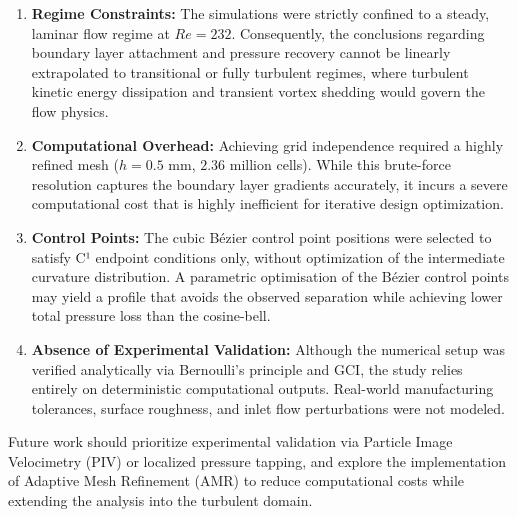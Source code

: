 \documentclass[12pt, a4paper]{article}
\begin{document}
\begin{enumerate}
	\item \textbf{Regime Constraints:} The simulations were strictly confined to a steady, laminar flow regime at $Re = 232$. Consequently, the conclusions regarding boundary layer attachment and pressure recovery cannot be linearly extrapolated to transitional or fully turbulent regimes, where turbulent kinetic energy dissipation and transient vortex shedding would govern the flow physics.
	\item \textbf{Computational Overhead:} Achieving grid independence required a highly refined mesh ($h = 0.5$ mm, $2.36$ million cells). While this brute-force resolution captures the boundary layer gradients accurately, it incurs a severe computational cost that is highly inefficient for iterative design optimization. 

	\item \textbf{Control Points:} The cubic Bézier control point positions were selected to satisfy C¹ endpoint conditions only, without optimization of the intermediate curvature distribution. A parametric optimisation of the Bézier control points may yield a profile that avoids the observed separation while achieving lower total pressure loss than the cosine-bell.
	\item \textbf{Absence of Experimental Validation:} Although the numerical setup was verified analytically via Bernoulli's principle and GCI, the study relies entirely on deterministic computational outputs. Real-world manufacturing tolerances, surface roughness, and inlet flow perturbations were not modeled.
	
\end{enumerate}

Future work should prioritize experimental validation via Particle Image Velocimetry (PIV)\cite{piv_ref} or localized pressure tapping, and explore the implementation of Adaptive Mesh Refinement (AMR) to reduce computational costs while extending the analysis into the turbulent domain.

\end{document}
